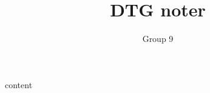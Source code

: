 \documentclass[11pt,oneside]{book}
\title{DTG noter}
\author{Group 9}
\begin{document}
    \maketitle

    \tableofcontents


    {content}
\end{document}
